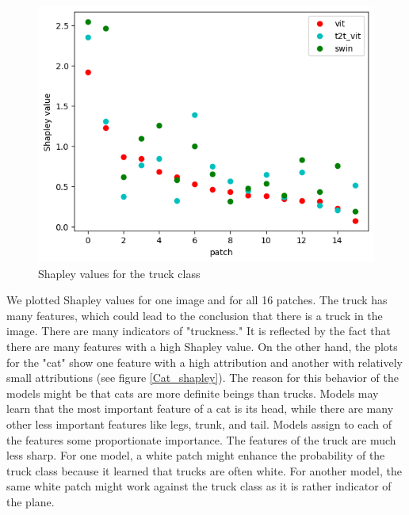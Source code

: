 \documentclass[magisterska,en]{pracamgr}
\begin{document}
\begin{figure}[H]
\centering
\includegraphics[scale=0.5]{./images/Truck_shapley.png}
\caption{Shapley values for the truck class}
\label{Truck_shapley}
\end{figure}

We plotted Shapley values for one image and for all 16 patches. The truck has many features, which could lead to the conclusion that there is a truck in the image. There are many indicators of "truckness." It is reflected by the fact that there are many features with a high Shapley value. On the other hand, the plots for the "cat" show one feature with a high attribution and another with relatively small attributions (see figure \ref{Cat_shapley}). The reason for this behavior of the models might be that cats are more definite beings than trucks. Models may learn that the most important feature of a cat is its head, while there are many other less important features like legs, trunk, and tail. Models assign to each of the features some proportionate importance. The features of the truck are much less sharp. For one model, a white patch might enhance the probability of the truck class because it learned that trucks are often white. For another model, the same white patch might work against the truck class as it is rather indicator of the plane.
\end{document}
